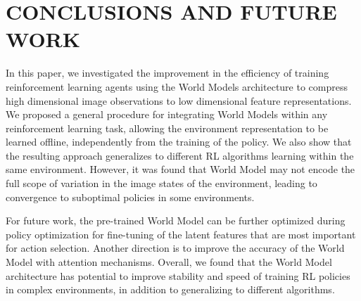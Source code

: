 \section{CONCLUSIONS AND FUTURE WORK}

In this paper, we investigated the improvement in the efficiency of training reinforcement learning agents using the World Models architecture to compress high dimensional image observations to low dimensional feature representations. We proposed a general procedure for integrating World Models within any reinforcement learning task, allowing the environment representation to be learned offline, independently from the training of the policy. We also show that the resulting approach generalizes to different RL algorithms learning within the same environment. However, it was found that World Model may not encode the full scope of variation in the image states of the environment, leading to convergence to suboptimal policies in some environments.

For future work, the pre-trained World Model can be further optimized during policy optimization for fine-tuning of the latent features that are most important for action selection. Another direction is to improve the accuracy of the World Model with attention mechanisms. Overall, we found that the World Model architecture has potential to improve stability and speed of training RL policies in complex environments, in addition to generalizing to different algorithms.

